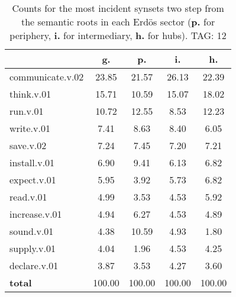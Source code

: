 \begin{table}[h!]
\begin{center}
\begin{tabular}{| l | c | c | c | c |}\hline
 & g. & p. & i. & h. \\\hline
communicate.v.02 & 23.85  & 21.57  & 26.13  & 22.39 \\\hline
think.v.01 & 15.71  & 10.59  & 15.07  & 18.02 \\\hline
run.v.01 & 10.72  & 12.55  & 8.53  & 12.23 \\\hline
write.v.01 & 7.41  & 8.63  & 8.40  & 6.05 \\\hline
save.v.02 & 7.24  & 7.45  & 7.20  & 7.21 \\\hline
install.v.01 & 6.90  & 9.41  & 6.13  & 6.82 \\\hline
expect.v.01 & 5.95  & 3.92  & 5.73  & 6.82 \\\hline
read.v.01 & 4.99  & 3.53  & 4.53  & 5.92 \\\hline
increase.v.01 & 4.94  & 6.27  & 4.53  & 4.89 \\\hline
sound.v.01 & 4.38  & 10.59  & 4.93  & 1.80 \\\hline
supply.v.01 & 4.04  & 1.96  & 4.53  & 4.25 \\\hline
declare.v.01 & 3.87  & 3.53  & 4.27  & 3.60 \\\hline
{{\bf total}} & 100.00  & 100.00  & 100.00  & 100.00 \\\hline
\end{tabular}
\caption{Counts for the most incident synsets two step from the semantic roots in each Erd\"os sector ({\bf p.} for periphery, {\bf i.} for intermediary, {\bf h.} for hubs). TAG: 12}
\end{center}
\end{table}